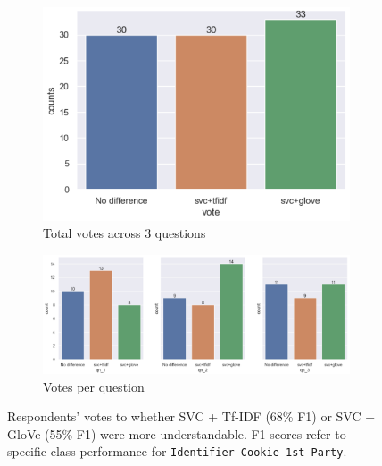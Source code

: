 \begin{figure}[!ht]
  \centering
    \begin{subfigure}[b]{0.75\textwidth}
      \includegraphics[width=1\linewidth]{figures/part5_votes.png}
      \caption{Total votes across 3 questions}
    \end{subfigure}
    \hfill
    \centering
    \begin{subfigure}[b]{1\textwidth}
      \includegraphics[width=1\linewidth]{figures/part_5_votes_1.png}
      \caption{Votes per question}
    \end{subfigure}
    \caption{Respondents' votes to whether SVC + Tf-IDF (68\% F1) or SVC + GloVe (55\% F1) were more understandable. F1 scores refer to specific class performance for \texttt{Identifier Cookie 1st Party}.}
    \label{fig:part5}
\end{figure}
